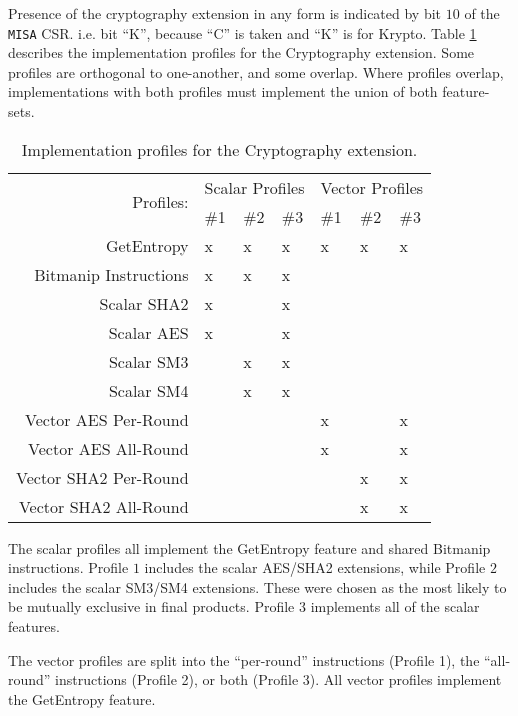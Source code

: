 
Presence of the cryptography extension in any form is indicated
by bit $10$ of the {\tt MISA} CSR.
i.e. bit ``K'', because ``C'' is taken and ``K'' is for Krypto.
Table \ref{tab:profiles} describes the implementation profiles for the
Cryptography extension.
Some profiles are orthogonal to one-another, and some overlap.
Where profiles overlap, implementations with both profiles must
implement the union of both feature-sets.


\begin{table}[h]
\centering
\begin{tabular}{r|lll|lll}
\multirow{2}{*}{Profiles:} &
\multicolumn{3}{c|}{Scalar Profiles} &
\multicolumn{3}{c}{Vector Profiles} \\
                      & \#1  & \#2  & \#3 & \#1  & \#2  & \#3 \\
\hline
GetEntropy            &   x  &   x  &  x  &   x  &  x   &  x  \\
Bitmanip Instructions &   x  &   x  &  x  &      &      &     \\
Scalar SHA2           &   x  &      &  x  &      &      &     \\
Scalar AES            &   x  &      &  x  &      &      &     \\
Scalar SM3            &      &   x  &  x  &      &      &     \\
Scalar SM4            &      &   x  &  x  &      &      &     \\
\hline
Vector AES Per-Round  &      &      &     &   x  &      &  x  \\
Vector AES All-Round  &      &      &     &   x  &      &  x  \\
Vector SHA2 Per-Round &      &      &     &      &  x   &  x  \\
Vector SHA2 All-Round &      &      &     &      &  x   &  x  
\end{tabular}
\caption{
Implementation profiles for the Cryptography extension.
}
\label{tab:profiles}
\end{table}

The scalar profiles all implement the GetEntropy feature and
shared Bitmanip instructions.
Profile $1$ includes the scalar AES/SHA2 extensions, while
Profile $2$ includes the scalar SM3/SM4  extensions.
These were chosen as the most likely to be mutually exclusive in final
products.
Profile $3$ implements all of the scalar features.

The vector profiles are split into the ``per-round'' instructions
(Profile 1),
the ``all-round'' instructions (Profile 2),
or both (Profile 3).
All vector profiles implement the GetEntropy feature.
